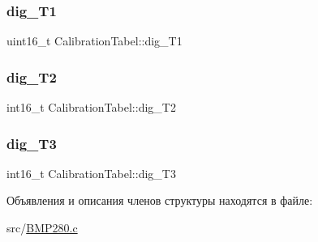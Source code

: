 \subsubsection{\texorpdfstring{dig\_T1}{dig\_T1}}
{\footnotesize\ttfamily uint16\+\_\+t Calibration\+Tabel\+::dig\+\_\+\+T1}

\mbox{\label{struct_calibration_tabel_ac6b10ddec5c55773292287f76dfbbff4}} 
\subsubsection{\texorpdfstring{dig\_T2}{dig\_T2}}
{\footnotesize\ttfamily int16\+\_\+t Calibration\+Tabel\+::dig\+\_\+\+T2}

\mbox{\label{struct_calibration_tabel_acd78c986f7c42856a8e55e48bc811806}} 
\subsubsection{\texorpdfstring{dig\_T3}{dig\_T3}}
{\footnotesize\ttfamily int16\+\_\+t Calibration\+Tabel\+::dig\+\_\+\+T3}



Объявления и описания членов структуры находятся в файле\+:\begin{DoxyCompactItemize}
\item 
src/\mbox{\hyperlink{_b_m_p280_8c}{B\+M\+P280.\+c}}\end{DoxyCompactItemize}
